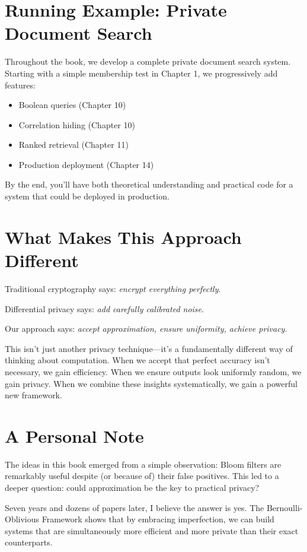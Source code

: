 \section*{Running Example: Private Document Search}

Throughout the book, we develop a complete private document search system. Starting with a simple membership test in Chapter 1, we progressively add features:
\begin{itemize}
    \item Boolean queries (Chapter 10)
    \item Correlation hiding (Chapter 10)
    \item Ranked retrieval (Chapter 11)
    \item Production deployment (Chapter 14)
\end{itemize}

By the end, you'll have both theoretical understanding and practical code for a system that could be deployed in production.

\section*{What Makes This Approach Different}

Traditional cryptography says: \emph{encrypt everything perfectly}.

Differential privacy says: \emph{add carefully calibrated noise}.

Our approach says: \emph{accept approximation, ensure uniformity, achieve privacy}.

This isn't just another privacy technique—it's a fundamentally different way of thinking about computation. When we accept that perfect accuracy isn't necessary, we gain efficiency. When we ensure outputs look uniformly random, we gain privacy. When we combine these insights systematically, we gain a powerful new framework.

\section*{A Personal Note}

The ideas in this book emerged from a simple observation: Bloom filters are remarkably useful despite (or because of) their false positives. This led to a deeper question: could approximation be the key to practical privacy?

Seven years and dozens of papers later, I believe the answer is yes. The Bernoulli-Oblivious Framework shows that by embracing imperfection, we can build systems that are simultaneously more efficient and more private than their exact counterparts.

